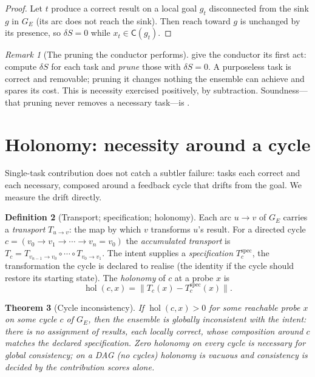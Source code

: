 \documentclass[twocolumn,11pt,a4paper]{article}
\theoremstyle{sup}
\newtheorem{theorem}{Theorem}[section]
\theoremstyle{definition}
\newtheorem{definition}[theorem]{Definition}
\theoremstyle{remark}
\newtheorem{remark}[theorem]{Remark}
\DeclareMathOperator{\hol}{hol}
\newcommand{\reach}{\mathrm{reach}}   %
\newcommand{\Sent}{S}                 %
\newcommand{\cell}{\mathsf{C}}        %
\newcommand{\task}{t}
\newcommand{\Ens}{E}                  %
\newcommand{\contrib}{\delta\Sent}    %
\newcommand{\norm}[1]{\lVert#1\rVert}
\begin{document}
\begin{proof}
Let $\task$ produce a correct result on a local goal $g_\task$ disconnected from
the sink $g$ in $G_\Ens$ (its arc does not reach the sink). Then $\reach$ toward
$g$ is unchanged by its presence, so $\contrib=0$ while $x_\task\in\cell(g_\task)$.
\end{proof}

\begin{remark}[The pruning the conductor performs]
\label{rem:prune}
 give the conductor its first act:
compute $\contrib$ for each task and \emph{prune} those with $\contrib=0$. A
purposeless task is correct and removable; pruning it changes nothing the ensemble
can achieve and spares its cost. This is necessity exercised positively, by
subtraction. Soundness---that pruning never removes a necessary task---is
.
\end{remark}

\section{Holonomy: necessity around a cycle}
\label{sec:holonomy}

Single-task contribution does not catch a subtler failure: tasks each correct and
each necessary, composed around a feedback cycle that drifts from the goal. We
measure the drift directly.

\begin{definition}[Transport; specification; holonomy]
\label{def:holonomy}
Each arc $u\to v$ of $G_\Ens$ carries a \emph{transport} $T_{u\to v}$: the map by
which $v$ transforms $u$'s result. For a directed cycle $c=(v_0\to
v_1\to\cdots\to v_n=v_0)$ the \emph{accumulated transport} is
$T_c=T_{v_{n-1}\to v_0}\circ\cdots\circ T_{v_0\to v_1}$. The intent supplies a
\emph{specification} $T_c^{\mathrm{spec}}$, the transformation the cycle is
declared to realise (the identity if the cycle should restore its starting
state). The \emph{holonomy} of $c$ at a probe $x$ is
\[
\hol(c,x)=\norm{T_c(x)-T_c^{\mathrm{spec}}(x)} .
\]
\end{definition}

\begin{theorem}[Cycle inconsistency]
\label{thm:holonomy}
If $\hol(c,x)>0$ for some reachable probe $x$ on some cycle $c$ of $G_\Ens$, then
the ensemble is globally inconsistent with the intent: there is no assignment of
results, each locally correct, whose composition around $c$ matches the
declared specification. Zero holonomy on every cycle is necessary for global
consistency; on a DAG (no cycles) holonomy is vacuous and consistency is decided
by the contribution scores alone.
\end{theorem}
\end{document}
